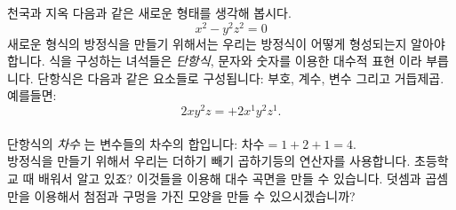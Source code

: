 \begin{surferPage}{천국과 지옥}
다음과 같은 새로운 형태를 생각해 봅시다. \\
\smallskip
\[x^2	- y^2z^2	= 0\]
\singlespacing
새로운 형식의 방정식을 만들기 위해서는 우리는 방정식이 어떻게 형성되는지 알아야 합니다. 식을 구성하는 녀석들은 {\it 단항식}, 문자와 숫자를 이용한 대수적 표현 이라 부릅니다.
\singlespacing
단항식은 다음과 같은 요소들로 구성됩니다:
부호, 계수, 변수 그리고 거듭제곱. \\
\singlespacing
예를들면: 
\smallskip
\[2xy^2z = +2x^1y^2z^1.\]
\\
\smallskip
단항식의 {\it 차수} 는 변수들의 차수의 합입니다: $차수 = 1+2+1=4$.  \\
\singlespacing
방정식을 만들기 위해서 우리는 더하기 빼기 곱하기등의 연산자를 사용합니다. 초등학교 때 배워서 알고 있죠? 이것들을 이용해 대수 곡면을 만들 수 있습니다.   
\singlespacing
덧셈과 곱셈만을 이용해서 첨점과 구멍을 가진 모양을 만들 수 있으시겠습니까?
\end{surferPage}
